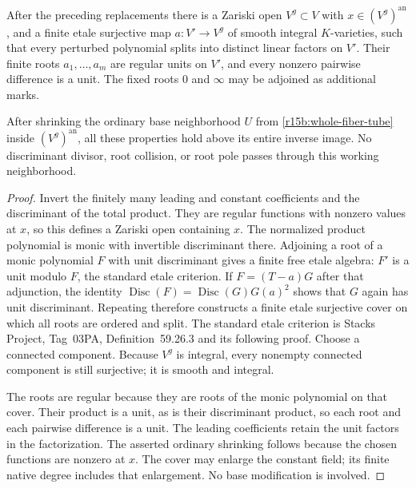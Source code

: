 \begin{corollary}
\label{r15b:local-etale-splitting}
After the preceding replacements there is a Zariski open
$V^g\subset V$ with $x\in(V^g)^{\mathrm{an}}$, and a finite
etale surjective map $a:V'\to V^g$ of smooth integral
$K$-varieties, such that every perturbed polynomial splits
into distinct linear factors on $V'$. Their finite roots
$a_1,\ldots,a_m$ are regular units on $V'$, and every nonzero
pairwise difference is a unit. The fixed roots $0$ and
$\infty$ may be adjoined as additional marks.

After shrinking the ordinary base neighborhood $U$ from
\eqref{r15b:whole-fiber-tube} inside $(V^g)^{\mathrm{an}}$,
all these properties hold above its entire inverse image.
No discriminant divisor, root collision, or root pole passes
through this working neighborhood.
\end{corollary}

\begin{proof}
Invert the finitely many leading and constant coefficients and
the discriminant of the total product. They are regular
functions with nonzero values at $x$, so this defines a Zariski
open containing $x$. The normalized product polynomial is monic
with invertible discriminant there. Adjoining a root of a monic
polynomial $F$ with unit discriminant gives a finite free etale
algebra: $F'$ is a unit modulo $F$, the standard etale criterion.
If $F=(T-a)G$ after that adjunction, the identity
$\operatorname{Disc}(F)=\operatorname{Disc}(G)G(a)^2$
shows that $G$ again has unit discriminant. Repeating therefore
constructs a finite etale surjective cover on which all roots
are ordered and split. The standard etale criterion is Stacks
Project, Tag~03PA, Definition~59.26.3 and its following proof.
Choose a connected
component. Because $V^g$ is integral, every nonempty connected
component is still surjective; it is smooth and integral.

The roots are regular because they are roots of the monic
polynomial on that cover. Their product is a unit, as is their
discriminant product, so each root and each pairwise difference
is a unit. The leading coefficients retain the unit factors in
the factorization. The asserted ordinary shrinking follows
because the chosen functions are nonzero at $x$. The cover
may enlarge the constant field; its finite native degree
includes that enlargement. No base modification is involved.
\end{proof}

